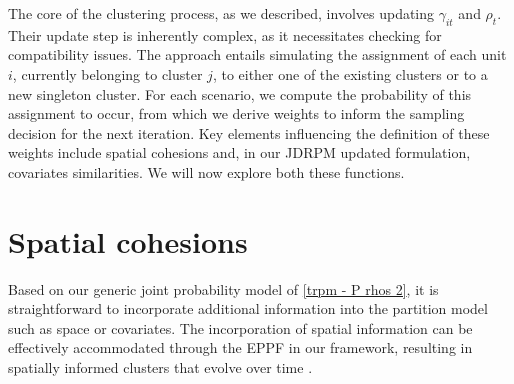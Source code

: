 \documentclass[12pt,	%
	a4paper,		%
	twoside,		%
	openright,		%
	titlepage,%
	]{book}
\theoremstyle{definition}
\let\cite\citep
\begin{document}
The core of the clustering process, as we described, involves updating $\gamma_{it}$ and $\rho_t$. Their update step is inherently complex, as it necessitates checking for compatibility issues. The approach entails simulating the assignment of each unit $i$, currently belonging to cluster $j$, to either one of the existing clusters or to a new singleton cluster. For each scenario, we compute the probability of this assignment to occur, from which we derive weights to inform the sampling decision for the next iteration. Key elements influencing the definition of these weights include spatial cohesions and, in our JDRPM updated formulation, covariates similarities. We will now explore both these functions.




\section{Spatial cohesions}
\label{Spatial cohesion analysis}

Based on our generic joint probability model of \eqref{trpm - P rhos 2}, it is straightforward to incorporate additional information into the partition model such as space or covariates. The incorporation of spatial information can be effectively accommodated through the EPPF in our framework, resulting in spatially informed clusters that evolve over time \cite{1-drpm}.
\end{document}
